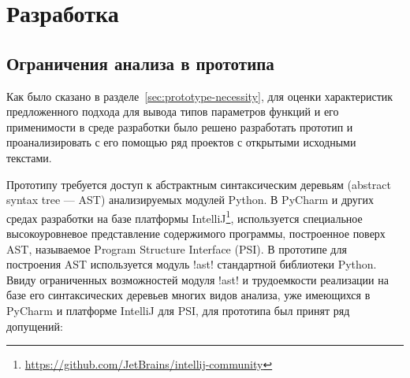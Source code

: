 \chapter{Разработка}
\label{sec:development}

\section{Ограничения анализа в прототипа}
\label{sec:prototype-limits}

Как было сказано в разделе~\ref{sec:prototype-necessity}, для оценки
характеристик предложенного подхода для вывода типов параметров функций и его
применимости в среде разработки было решено разработать прототип и
проанализировать с его помощью ряд проектов с открытыми исходными текстами.

Прототипу требуется доступ к абстрактным синтаксическим деревьям (abstract
syntax tree --- AST) анализируемых модулей Python. В PyCharm и других средах
разработки на базе платформы
IntelliJ\footnote{\url{https://github.com/JetBrains/intellij-community}},
используется специальное высокоуровневое представление содержимого программы,
построенное поверх AST, называемое Program Structure Interface (PSI). 
В прототипе для построения AST используется модуль !ast! стандартной библиотеки
Python. Ввиду ограниченных возможностей модуля !ast! и трудоемкости реализации на
базе его синтаксических деревьев многих видов анализа, уже имеющихся в PyCharm и
платформе IntelliJ для PSI, для прототипа был принят ряд допущений:

